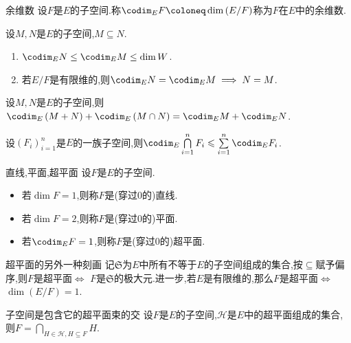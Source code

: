 \begin{definition}{余维数}{}
	设$F$是$E$的子空间.称$\codim_{E}F\coloneq\dim\left(E/F\right)$称为$F$在$E$中的余维数.
\end{definition}

\begin{proposition}{}{}
	设$M,N$是$E$的子空间,$M\subseteq N$.
	\begin{enumerate}
		\item $\codim_{E}N\leq\codim_{E}M\leq\dim W$.
		\item 若$E/F$是有限维的,则$\codim_{E}N=\codim_{E}M\implies N=M$.
	\end{enumerate}
\end{proposition}

\begin{proposition}{}{}
	设$M,N$是$E$的子空间,则$\codim_{E}\left(M+N\right)+\codim_{E}\left(M\cap N\right)=\codim_{E}M+\codim_{E}N$.
\end{proposition}

\begin{proposition}{}{}
	设$\left(F_{i}\right)_{i=1}^{n}$是$E$的一族子空间,则$\codim_{E}\bigcap\limits_{i=1}^{n}F_{i}\leqslant\sum\limits_{i=1}^{n}\codim_{E}F_{i}$.
\end{proposition}

\begin{definition}{直线,平面,超平面}{}
	设$F$是$E$的子空间.
	\begin{itemize}
		\item 若$\dim F=1$,则称$F$是(穿过$0$的)直线.
		\item 若$\dim F=2$,则称$F$是(穿过$0$的)平面.
		\item 若$\codim_{E}F=1$,则称$F$是(穿过$0$的)超平面.
	\end{itemize}
\end{definition}

\begin{remark}{超平面的另外一种刻画}{}
	记$\mathfrak{S}$为$E$中所有不等于$E$的子空间组成的集合,按$\subseteq$赋予偏序,则$F$是超平面$\iff$ $F$是$\mathfrak{S}$的极大元.进一步,若$E$是有限维的,那么$F$是超平面$\iff$ $\dim\left(E/F\right)=1$.
\end{remark}

\begin{proposition}{子空间是包含它的超平面束的交}{}
	设$F$是$E$的子空间,$\mathcal{H}$是$E$中的超平面组成的集合,则$F=\bigcap\limits_{H\in\mathcal{H},H\subseteq F}H$.
\end{proposition}
